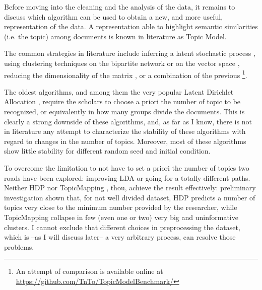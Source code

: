 \documentclass[a4paper, 11pt, headings=standardclasses, tablecaptionsbelow]{scrartcl}
\begin{document}
Before moving into the cleaning and the analysis of the data, it remains to discuss which algorithm can be used to obtain a new, and more useful, representation of the data. A representation able to highlight semantic similarities (i.e. the topic) among documents is known in literature as Topic Model.

The common strategies in literature include inferring a latent stochastic process \parencite{blei2003,teh2005,griffiths2004,hofmann1999}, using clustering techniques on the bipartite network \parencite{gerlach2018} or on the vector space \parencite{angelov2020,grootendorst2022}, reducing the dimensionality of the matrix \parencite{kim2008}, or a combination of the previous \parencite{lancichinetti2015}\footnote{An attempt of comparison is available online at \url{https://github.com/TnTo/TopicModelBenchmark/}}.

The oldest algorithms, and among them the very popular Latent Dirichlet Allocation \parencite[LDA][]{blei2003}, require the scholars to choose a priori the number of topic to be recognized, or equivalently in how many groups divide the documents. This is clearly a strong downside of these algorithms, and, as far as I know, there is not in literature any attempt to characterize the stability of these algorithms with regard to changes in the number of topics. Moreover, most of these algorithms show little stability for different random seed and initial condition.

To overcome the limitation to not have to set a priori the number of topics two roads have been explored: improving LDA \parencite[like in][]{teh2005,lancichinetti2015} or going for a totally different paths.
Neither HDP \parencite{teh2005} nor TopicMapping \parencite{lancichinetti2015}, thou, achieve the result effectively: preliminary investigation shown that, for not well divided dataset, HDP predicts a number of topics very close to the minimum number provided by the researcher, while TopicMapping collapse in few (even one or two) very big and uninformative clusters. I cannot exclude that different choices in preprocessing the dataset, which is --as I will discuss later-- a very arbitrary process, can resolve those problems.
\end{document}

